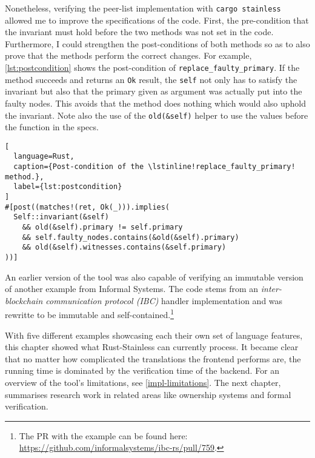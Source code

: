 Nonetheless, verifying the peer-list implementation with
\passthrough{\lstinline!cargo stainless!} allowed me  to improve the
specifications of the code. First, the pre-condition that the invariant must
hold before the two methods was not set in the code. Furthermore, I could
strengthen the post-conditions of  both methods so as to also prove that the
methods perform the correct changes. For example, \autoref{lst:postcondition}
shows the post-condition of \lstinline!replace_faulty_primary!. If the method
succeeds and returns an \lstinline!Ok! result, the \lstinline!self! not only has
to satisfy the invariant but also that the primary given as argument  was
actually put into the faulty nodes. This avoids that the method does nothing
which would also uphold the invariant. Note also the use of the
\lstinline!old(&self)! helper to use the values before the function in the
specs.

\begin{lstlisting}[
  language=Rust,
  caption={Post-condition of the \lstinline!replace_faulty_primary! method.},
  label={lst:postcondition}
]
#[post((matches!(ret, Ok(_))).implies(
  Self::invariant(&self)
    && old(&self).primary != self.primary
    && self.faulty_nodes.contains(&old(&self).primary)
    && old(&self).witnesses.contains(&self.primary)
))]
\end{lstlisting}

An earlier version of the tool was also capable of verifying an immutable
version  of another example from Informal Systems. The code stems from an
\emph{inter-blockchain communication protocol (IBC)} handler implementation and
was rewritte to be immutable and self-contained.\footnote{The PR with the
example can be found here:
\url{https://github.com/informalsystems/ibc-rs/pull/759}.}

\hfill \break \noindent With five different examples showcasing each their own
set of language features, this chapter showed what Rust-Stainless can currently
process. It became clear that no matter how complicated the translations the
frontend performs are, the running time is dominated by the verification time of
the backend. For an overview of the tool's limitations, see
\autoref{impl-limitations}. The next chapter, summarises research  work in
related areas like ownership systems and formal verification.
